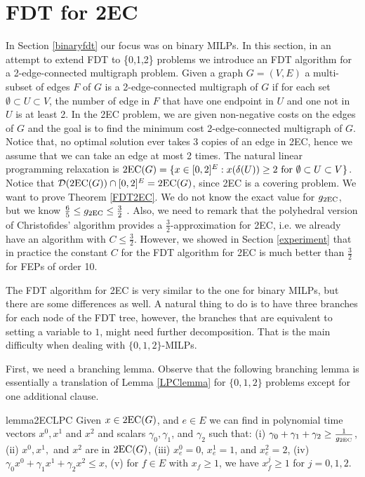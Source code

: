 

\section{FDT for 2EC}\label{2EC}

In Section \ref{binaryfdt} our focus was on binary MILPs. In this section, in an attempt to extend FDT to \{0,1,2\} problems we introduce an FDT algorithm for a 2-edge-connected multigraph problem. Given a graph $G=(V,E)$ a multi-subset of edges $F$ of $G$ is a 2-edge-connected multigraph of $G$ if for each set $\emptyset\subset U \subset V$, the number of edge in $F$ that have one endpoint in $U$ and one not in $U$ is at least 2. In the 2EC problem, we are given non-negative costs on the edges of $G$ and the goal is to find the minimum cost 2-edge-connected multigraph of $G$. Notice that, no optimal solution ever takes 3 copies of an edge in 2EC, hence we assume that we can take an edge at most 2 times. The natural linear programming relaxation is $\operatorname{2EC}(G) = \{x\in [0,2]^E: x(\delta(U))\geq 2 \mbox{ for } \emptyset \subset U \subset V\}$. Notice that $\operatorname{\mathcal{D}}(\operatorname{2EC}(G))\cap [0,2]^{E} = \operatorname{2EC}(G)$, since 2EC is a covering problem. We want to prove Theorem \ref{FDT2EC}.
\FDTEC*
We do not know the exact value for $g_{\operatorname{2EC}}$, but we know $\frac{6}{5} \leq g_{\operatorname{2EC}} \leq \frac{3}{2}$ \cite{carr-ravi,Wolsey1980}. Also, we need to remark that the polyhedral version of Christofides' algorithm provides a $\frac{3}{2}$-approximation for 2EC, i.e. we already have an algorithm with $C\leq \frac{3}{2}$. However, we showed in Section \ref{experiment} that in practice the constant $C$ for the FDT algorithm for 2EC is much better than $\frac{3}{2}$ for FEPs of order 10.

The FDT algorithm for 2EC is very similar to the one for binary MILPs, but there are some differences as well. A natural thing to do is to have three branches for each node of the FDT tree, however, the branches that are equivalent to setting a variable to $1$, might need further decomposition. That is the main difficulty when dealing with $\{0,1,2\}$-MILPs.

First, we need a branching lemma. Observe that  the following branching lemma is essentially a translation of Lemma \ref{LPClemma} for $\{0,1,2\}$ problems except for one additional clause. 

\begin{restatable}{lemma}{2ECLPC}
	\label{LPC2EC}
	Given $x\in \operatorname{2EC}(G)$, and $e\in E$ we can find in polynomial time vectors $x^0,x^1$ and $x^2$ and scalars $\gamma_0,\gamma_1$, and $\gamma_2$ such that: (i) $\gamma_0 + \gamma_1 +\gamma_2 \geq \frac{ 1}{g_{\operatorname{2EC}}}$, (ii) $x^0,x^1,$ and $x^2$ are in  $ \operatorname{2EC}(G)$, (iii) $x^0_e=0$, $x^1_e=1$, and $x^2_e=2$, (iv) $\gamma_0 x^0 + \gamma_1{x}^1  + \gamma_2x^2\leq {x}$, (v) for $f\in E$ with ${x}_f\geq 1$, we have $x^j_f\geq 1$ for $j=0,1,2$.
\end{restatable}

